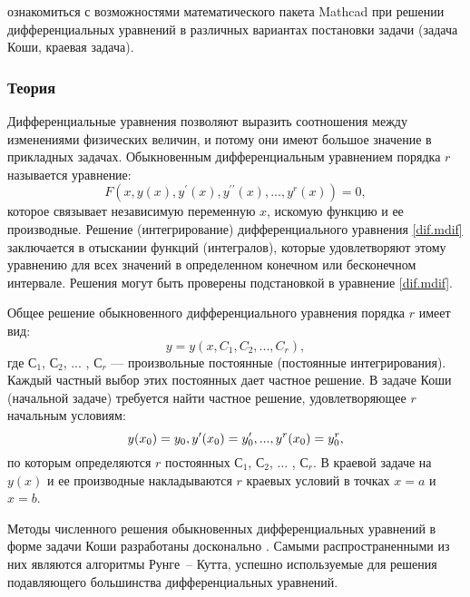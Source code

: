 
\goal ознакомиться с возможностями математического пакета Mathcad при решении дифференциальных уравнений в различных вариантах постановки задачи (задача Коши, краевая задача).

\subsubsection*{Теория}

Дифференциальные уравнения позволяют выразить соотношения между изменениями физических величин, и потому они имеют большое значение в прикладных задачах. Обыкновенным дифференциальным уравнением порядка $r$ называется уравнение:
\begin{equation} \label{dif.mdif}
F(x,y(x),y^\prime(x),y^{\prime \prime}(x), ... , y^r(x))=0,
\end{equation}
которое связывает независимую переменную $x$, искомую функцию и ее производные. Решение (интегрирование) дифференциального уравнения \ref{dif.mdif} заключается в отыскании функций (интегралов), которые удовлетворяют этому уравнению для всех значений  в определенном конечном  или бесконечном интервале. Решения могут быть проверены подстановкой в уравнение \ref{dif.mdif}.

Общее решение обыкновенного дифференциального уравнения порядка $r$ имеет вид:
\begin{equation}
y=y(x,C_1,C_2, ... ,C_r),
\end{equation}
где $С_1$, $С_2$, ... , $С_r$ --- произвольные постоянные (постоянные интегрирования). Каждый частный выбор этих постоянных дает частное решение. В задаче Коши (начальной задаче) требуется найти частное решение, удовлетворяющее $r$ начальным условиям:
\begin{equation}
y(x_0)=y_0, \newline
y^{\prime}(x_0)=y_0^{\prime}, ... , y^{r}(x_0)=y^r_0,
\end{equation}
по которым определяются $r$ постоянных $С_1$, $С_2$, ... , $С_r$. В краевой задаче на $y(x)$ и ее производные накладываются $r$ краевых условий в точках $x=a$ и $x=b$.

Методы численного решения обыкновенных дифференциальных уравнений в форме задачи Коши разработаны досконально \cite{shipachevvs2005}. Самыми распространенными из них являются алгоритмы Рунге~-- Кутта, успешно используемые для решения подавляющего большинства дифференциальных уравнений. 


